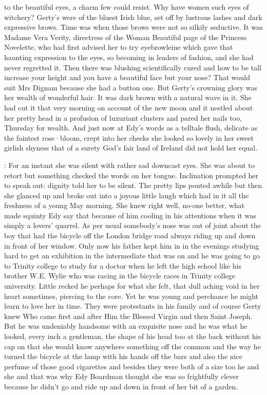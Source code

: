 to the beautiful eyes,
a charm few could resist.
Why have women such eyes of witchery?
Gerty's were of the bluest Irish blue,
set off by lustrous lashes
and dark expressive brows.
Time was
when those brows were not so silkily seductive.
It was Madame Vera Verity,
directress of the Woman Beautiful page of the Princess Novelette,
who had first advised her
to try eyebrowleine
which gave that haunting expression to the eyes,
so becoming in leaders of fashion,
and she had never regretted it.
Then there was blushing scientifically cured
and how to be tall
increase your height
and you have a beautiful face
but your nose?
That would suit Mrs Dignam
because she had a button one.
But Gerty's crowning glory
was her wealth of wonderful hair.
It was dark brown
with a natural wave in it.
She had cut it that very morning
on account of the new moon
and it nestled about her pretty head
in a profusion of luxuriant clusters
and pared her nails too,
Thursday for wealth.
And just now
at Edy's words
as a telltale flush,
delicate as the faintest rose·bloom,
crept into her cheeks
she looked so lovely
in her sweet girlish shyness
that of a surety
God's fair land of Ireland
did not hold her equal.

:
For an instant
she was silent
with rather sad downcast eyes.
She was about to retort
but something checked the words on her tongue.
Inclination prompted her to speak out:
dignity told her to be silent.
The pretty lips pouted awhile
but then she glanced up
and broke out into a joyous little laugh
which had in it
all the freshness
of a young May morning.
She knew right well,
no-one better,
what made squinty Edy say that
because of him cooling in his attentions
when it was simply a lovers' quarrel.
As per usual
somebody's nose was out of joint
about the boy that had the bicycle
off the London bridge road
always riding up and down
in front of her window.
Only now
his father kept him in
in the evenings
studying hard to get an exhibition
in the intermediate that was on
and he was going to go to Trinity college
to study for a doctor
when he left the high school
like his brother W.E. Wylie
who was racing in the bicycle races in Trinity college university.
Little recked he perhaps
for what she felt,
that dull aching void in her heart sometimes,
piercing to the core.
Yet he was young
and perchance he might learn to love her
in time.
They were protestants in his family
and of course
Gerty knew Who came first
and after Him the Blessed Virgin
and then Saint Joseph.
But he was undeniably handsome
with an exquisite nose
and he was what he looked,
every inch a gentleman,
the shape of his head too
at the back without his cap on
that she would know anywhere
something off the common
and the way he turned the bicycle at the lamp
with his hands off the bars
and also the nice perfume of those good cigarettes
and besides
they were both of a size too
he and she
and that was why
Edy Boardman thought she was so frightfully clever
because he didn't go
and ride up and down
in front of her bit of a garden.

